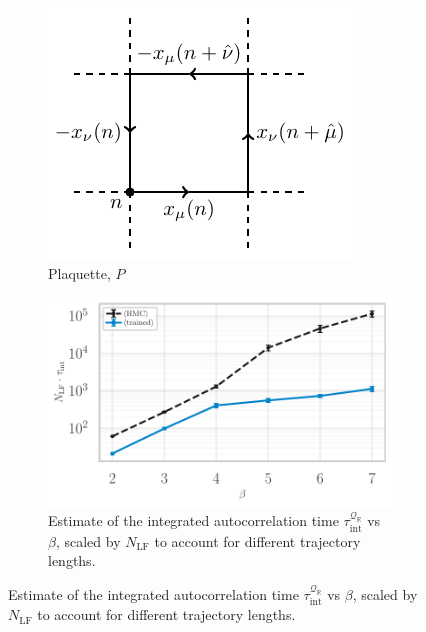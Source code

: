 \documentclass{article} %
\begin{document}
\begin{figure}[htpb]
   \centering
   \begin{subfigure}{0.34\textwidth}
      \includegraphics[width=\textwidth]{figures/plaq_tikz.pdf}
      \caption{\label{fig:plaquette}Plaquette, \(P\)}
   \end{subfigure}
   \hfill
   \begin{subfigure}{0.65\textwidth}
      \includegraphics[width=\textwidth]{figures/autocorr_vs_beta_blue_2120.pdf}
      \caption{\label{fig:autocorr_vs_beta}Estimate of the integrated autocorrelation time
      \(\tau_{\mathrm{int}}^{\mathcal{Q}_{\mathbb{R}}}\) vs \(\beta\), scaled by \(N_{\mathrm{LF}}\) to account for
   different trajectory lengths.}

\end{subfigure}
\end{figure}
\end{document}
